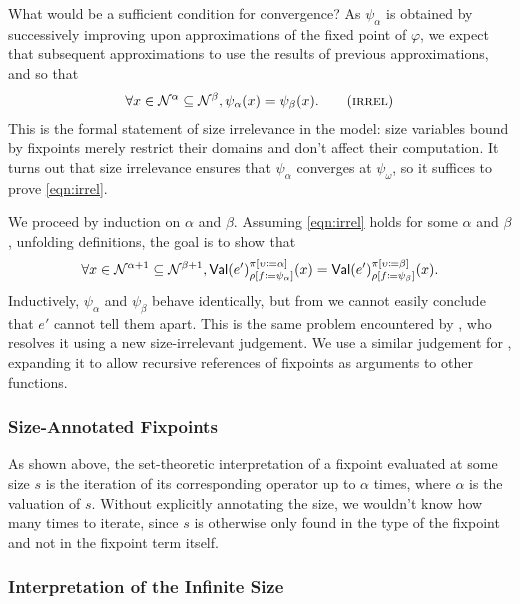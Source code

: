 What would be a sufficient condition for convergence?  As
$\psi_\alpha$ is obtained by successively improving upon
approximations of the fixed point of $\varphi$, we expect that
subsequent approximations to use the results of previous
approximations, and so that
\begin{align*}
  \forall x \in \McN^\alpha \subseteq \McN^\beta, \psi_\alpha(x) = \psi_\beta(x).
  \label{eqn:irrel}\tag{\textsc{irrel}}
\end{align*}
This is the formal statement of size irrelevance in the model:
size variables bound by fixpoints merely restrict their domains and don't
affect their computation.
It turns out that size irrelevance ensures that $\psi_\alpha$
converges at $\psi_\omega$,
so it suffices to prove \eqref{eqn:irrel}.

We proceed by induction on $\alpha$ and $\beta$.
Assuming \eqref{eqn:irrel} holds for some $\alpha$ and $\beta$,
unfolding definitions, the goal is to show that
%
$$\forall x \in \mathcal{N}^{\alpha+1} \subseteq \mathcal{N}^{\beta+1},
  \textsf{Val}(e')_{\rho [f \coloneqq \psi_\alpha]}^{\pi [\upsilon \coloneqq \alpha]}(x) =
  \textsf{Val}(e')_{\rho [f \coloneqq \psi_\beta]}^{\pi [\upsilon \coloneqq \beta]}(x).$$
%
Inductively, $\psi_\alpha$ and $\psi_\beta$ behave identically,
but from  we cannot easily conclude that $e'$ cannot tell
them apart.
This is the same problem encountered by \citet{barras-thesis},
who resolves it using a new size-irrelevant judgement.
We use a similar judgement for \langAnother,
expanding it to allow recursive references of fixpoints as arguments
to other functions.

\subsubsection{Size-Annotated Fixpoints}

As shown above, the set-theoretic interpretation of a fixpoint evaluated at some size $s$
is the iteration of its corresponding operator up to $\alpha$ times,
where $\alpha$ is the valuation of $s$.
Without explicitly annotating the size, we wouldn't know how many times to iterate,
since $s$ is otherwise only found in the type of the fixpoint and not in the fixpoint term itself.

\iffalse
\subsubsection{Interpretation of the Infinite Size}

